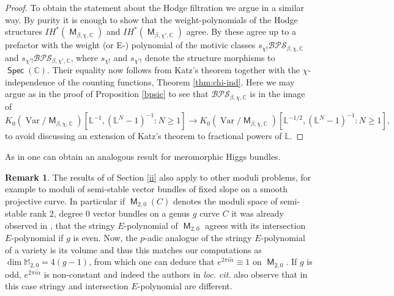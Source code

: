 \documentclass{article}
\DeclareMathOperator{\M}{{\mathsf{M}}}
\DeclareMathOperator{\Spec}{\mathsf{Spec}}
\newcommand{\BC}{{\mathbb{C}}}
\newcommand{\BL}{{\mathbb{L}}}
\newcommand{\BM}{{\mathbb{M}}}
\DeclareMathOperator{\Var}{Var}
\newcommand{\BPS}{\mathcal{BPS} }
\theoremstyle{definition}
\newtheorem{rmk}[definition]{Remark}
\theoremstyle{plain}
\begin{document}
\begin{proof}
To obtain the statement about the Hodge filtration we argue in a similar way. By purity it is enough to show that the weight-polynomials of the Hodge structures $IH^*(\M_{\beta,\chi,\BC})$ and $ IH^*(\M_{\beta,\chi',\BC})$ agree. By \cite[Theorem 5.6]{Me15} these agree up to a prefactor with the weight (or E-) polynomial of the motivic classes $s_{\chi!}\BPS_{\beta,\chi,\BC}$ and $s_{\chi'!}\BPS_{\beta,\chi',\BC}$, where $s_{\chi!}$ and $s_{\chi'!}$ denote the structure morphisms to $\Spec(\BC)$. Their equality now follows from Katz's theorem \cite[Theorem 6.1.2]{MR2453601} together with the $\chi$-independence of the counting functions, Theorem \ref{thm:chi-ind}. Here we may argue as in the proof of Proposition \ref{bpsic} to see that $\BPS_{\beta,\chi,\BC}$ is in the image of 
\[K_0(\Var/\M_{\beta,\chi,\BC})[\BL^{-1},(\BL^N-1)^{-1} : N \geq 1] \to K_0(\Var/\M_{\beta,\chi,\BC})[\BL^{-1/2},(\BL^N-1)^{-1} : N \geq 1],\]
to avoid discussing an extension of Katz's theorem to fractional powers of $\BL$.
\end{proof}

As in \cite{MS20} one can obtain an analogous result for meromorphic Higgs bundles. 


\begin{rmk}\label{KL} The results of of Section \ref{ii} also apply to other moduli problems, for example to moduli of semi-stable vector bundles of fixed slope on a smooth projective curve. In particular if  $\M_{2,0}(C)$ denotes the moduli space of semi-stable rank $2$, degree $0$ vector bundles on a genus $g$ curve $C$ it was already observed in \cite[Remark 6.2]{KL04}, that the stringy $E$-polynomial of $\M_{2,0}$ agrees with its intersection $E$-polynomial if $g$ is even. Now, the $p$-adic analogue of the stringy $E$-polynomial of a variety is its volume and thus this matches our computations as $\dim \BM_{2,0}= 4(g-1)$, from which one can deduce that $e^{2\pi i\tilde{\alpha}} \equiv 1$ on $\M_{2,0}$. If $g$ is odd, $e^{2\pi i\tilde{\alpha}}$ is non-constant and indeed the authors in \textit{loc. cit.} also observe that in this case stringy and intersection $E$-polynomial are different. 
\end{rmk}







\end{document}
